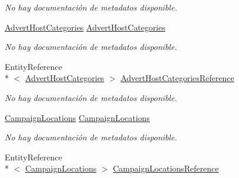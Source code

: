 \begin{DoxyCompactItemize}
\begin{DoxyCompactList}\small\item\em No hay documentación de metadatos disponible. \end{DoxyCompactList}\item 
\hyperlink{class_microsoft_1_1_samples_1_1_kinect_1_1_basic_interactions_1_1_advert_host_categories}{Advert\-Host\-Categories} \hyperlink{class_microsoft_1_1_samples_1_1_kinect_1_1_basic_interactions_1_1_advert_hosts_ac11f71c46c9135d552867db544c256bb}{Advert\-Host\-Categories}
\begin{DoxyCompactList}\small\item\em No hay documentación de metadatos disponible. \end{DoxyCompactList}\item 
Entity\-Reference\\*
$<$ \hyperlink{class_microsoft_1_1_samples_1_1_kinect_1_1_basic_interactions_1_1_advert_host_categories}{Advert\-Host\-Categories} $>$ \hyperlink{class_microsoft_1_1_samples_1_1_kinect_1_1_basic_interactions_1_1_advert_hosts_af64d18470cd6f433e259bc093693e6d7}{Advert\-Host\-Categories\-Reference}
\begin{DoxyCompactList}\small\item\em No hay documentación de metadatos disponible. \end{DoxyCompactList}\item 
\hyperlink{class_microsoft_1_1_samples_1_1_kinect_1_1_basic_interactions_1_1_campaign_locations}{Campaign\-Locations} \hyperlink{class_microsoft_1_1_samples_1_1_kinect_1_1_basic_interactions_1_1_advert_hosts_a3eb7c75571f1d6d1b54a8e3e55c19a9f}{Campaign\-Locations}
\begin{DoxyCompactList}\small\item\em No hay documentación de metadatos disponible. \end{DoxyCompactList}\item 
Entity\-Reference\\*
$<$ \hyperlink{class_microsoft_1_1_samples_1_1_kinect_1_1_basic_interactions_1_1_campaign_locations}{Campaign\-Locations} $>$ \hyperlink{class_microsoft_1_1_samples_1_1_kinect_1_1_basic_interactions_1_1_advert_hosts_a056ba2a466d2947307e51500183d42c9}{Campaign\-Locations\-Reference}

\end{DoxyCompactItemize}
